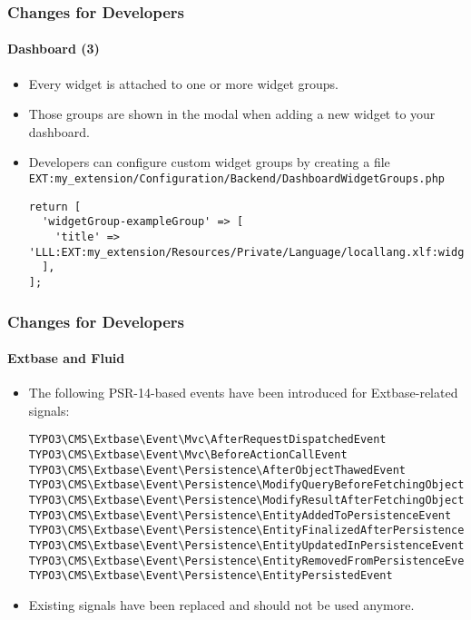 \begin{frame}[fragile]
	\frametitle{Changes for Developers}
	\framesubtitle{Dashboard (3)}

	\lstset{basicstyle=\tiny\ttfamily}

	\begin{itemize}
		\item Every widget is attached to one or more widget groups.
		\item Those groups are shown in the modal when adding a new widget to your dashboard.
		\item Developers can configure custom widget groups by creating a file\newline
			\smaller
				\texttt{EXT:my\_extension/Configuration/Backend/DashboardWidgetGroups.php}
			\normalsize

\vspace{-0.4cm}
\begin{lstlisting}
return [
  'widgetGroup-exampleGroup' => [
    'title' => 'LLL:EXT:my_extension/Resources/Private/Language/locallang.xlf:widget_group_name',
  ],
];
\end{lstlisting}

	\end{itemize}

\end{frame}


\begin{frame}[fragile]
	\frametitle{Changes for Developers}
	\framesubtitle{Extbase and Fluid}

	\lstset{basicstyle=\tiny\ttfamily}

	\begin{itemize}
		\item The following PSR-14-based events have been introduced for Extbase-related signals:

\vspace{-0.4cm}
\begin{lstlisting}
TYPO3\CMS\Extbase\Event\Mvc\AfterRequestDispatchedEvent
TYPO3\CMS\Extbase\Event\Mvc\BeforeActionCallEvent
TYPO3\CMS\Extbase\Event\Persistence\AfterObjectThawedEvent
TYPO3\CMS\Extbase\Event\Persistence\ModifyQueryBeforeFetchingObjectDataEvent
TYPO3\CMS\Extbase\Event\Persistence\ModifyResultAfterFetchingObjectDataEvent
TYPO3\CMS\Extbase\Event\Persistence\EntityAddedToPersistenceEvent
TYPO3\CMS\Extbase\Event\Persistence\EntityFinalizedAfterPersistenceEvent
TYPO3\CMS\Extbase\Event\Persistence\EntityUpdatedInPersistenceEvent
TYPO3\CMS\Extbase\Event\Persistence\EntityRemovedFromPersistenceEvent
TYPO3\CMS\Extbase\Event\Persistence\EntityPersistedEvent
\end{lstlisting}

		\item Existing signals have been replaced and should not be used anymore.

	\end{itemize}

\end{frame}

